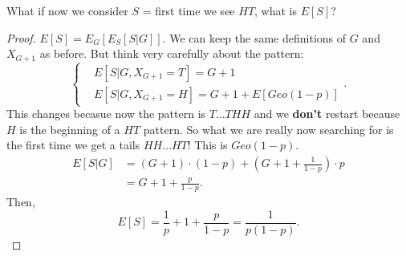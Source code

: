 \documentclass[a4paper]{article}
\begin{document}
\begin{remark}
  What if now we consider $S$ = first time we see  $HT$, what is  $E[S]$?

  \begin{proof}
    $E[S] = E_G[E_S[S|G]]$. We can keep the same definitions of  $G$ and  $X_{G+1}$ as before. But
    think very carefully about the pattern:
    \[
    \begin{cases}
      & E[S|G, X_{G+1} = T] = G+1 \\
      & E[S|G, X_{G+1} = H] = G + 1 + E[Geo(1-p)] 
    \end{cases}
    .\]  
    This changes becasue now the pattern is $T \ldots T H H$ and we \textbf{don't} restart because $H$ is
     the beginning of a  $HT$ pattern. So what we are really now searching for is the first time we 
     get a tails $H H \ldots H T$! This is $Geo(1-p)$.
    \begin{align*}
      E[S|G] &= (G+1) \cdot (1-p) + (G+1+\frac{1}{1-p}) \cdot p \\ 
             &= G+1 + \frac{p}{1-p}
    .\end{align*}
    Then, 
    \[
      E[S] = \frac{1}{p} + 1 + \frac{p}{1-p} = \frac{1}{p(1-p)}
    .\] 
  \end{proof} 
\end{remark}
\end{document}
